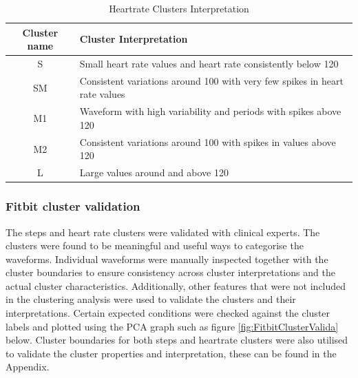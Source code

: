\documentclass{article}
\begin{document}
\begin{table}[H]
  \caption{Heartrate Clusters Interpretation}
  \label{hr_inter}
  \centering
  \begin{tabular}{ c|l }
    \toprule
    \cmidrule(r){1-2}
    Cluster name & Cluster Interpretation \\
    \hline
    S & Small heart rate values and heart rate consistently below 120 \\
    \hline
    SM & Consistent variations around 100 with very few spikes in heart rate values \\
    \hline
    M1 &  Waveform with high variability and periods with spikes above 120 \\
    \hline
    M2 & Consistent variations around 100 with spikes in values above 120 \\
    \hline
    L &  Large values around and above 120 \\
    \bottomrule
    \end{tabular}
\end{table}

\subsubsection{Fitbit cluster validation }

The steps and heart rate clusters were validated with clinical experts. The clusters were found to be meaningful and useful ways to categorise the waveforms. Individual waveforms were manually inspected together with the cluster boundaries to ensure consistency across cluster interpretations and the actual cluster characteristics. Additionally, other features that were not included in the clustering analysis were used to validate the clusters and their interpretations. Certain expected conditions were checked against the cluster labels and plotted using the PCA graph such as figure \ref{fig:FitbitClusterValida} below. Cluster boundaries for both steps and heartrate clusters were also utilised to validate the cluster properties and interpretation, these can be found in the Appendix. 
\end{document}
